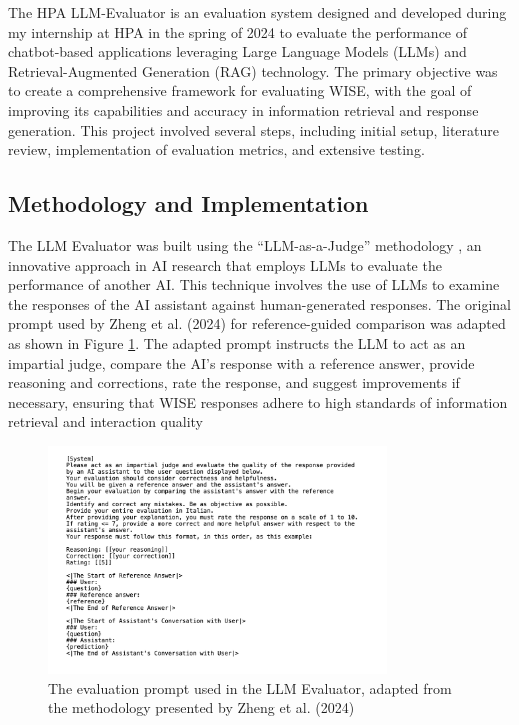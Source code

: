 The HPA LLM-Evaluator is an evaluation system designed and developed during my internship at HPA in the spring of 2024 to evaluate the performance of chatbot-based applications leveraging Large Language Models (LLMs) and Retrieval-Augmented Generation (RAG) technology. The primary objective was to create a comprehensive framework for evaluating WISE, with the goal of improving its capabilities and accuracy in information retrieval and response generation. This project involved several steps, including initial setup, literature review, implementation of evaluation metrics, and extensive testing.

\subsection{Methodology and Implementation}

The LLM Evaluator was built using the “LLM-as-a-Judge” methodology \cite{zheng2024judging}, an innovative approach in AI research that employs LLMs to evaluate the performance of another AI. This technique involves the use of LLMs to examine the responses of the AI assistant against human-generated responses. The original prompt used by Zheng et al. (2024) for reference-guided comparison was adapted as shown in Figure \ref{fig:llme-prompt}. The adapted prompt instructs the LLM to act as an impartial judge, compare the AI's response with a reference answer, provide reasoning and corrections, rate the response, and suggest improvements if necessary, ensuring that WISE responses adhere to high standards of information retrieval and interaction quality

\begin{figure}[h!]
    \centering
    \includegraphics[width=0.8\textwidth]{images/llme/llme-prompt.png}
    \caption{The evaluation prompt used in the LLM Evaluator, adapted from the methodology presented by Zheng et al. (2024)}
    \label{fig:llme-prompt}
\end{figure}

